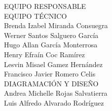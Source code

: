 {\Bold \LARGE EQUIPO RESPONSABLE}\\[2cm]
{\Bold \large \color{color1!89!black} EQUIPO TÉCNICO}\\[0.2cm]
Brenda Izabel Miranda Consuegra\\
Werner Santos Salguero García\\
Hugo Allan García Monterrosa\\
Henry Efraín Coc Ramírez\\
Lesvin Misael Gamez Hernández\\
Francisco Javier Romero Celis\\[0.8cm]
{\Bold \large \color{color1!89!black} DIAGRAMACIÓN Y DISEÑO}\\[0.2cm]
Andrea Michelle Rojas Salvatierra \\
Luis Alfredo Alvarado Rodríguez
